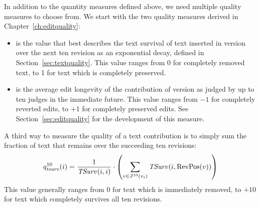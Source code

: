 In addition to the quantity measures defined above, we need
multiple quality measures to choose from.
We start with the two quality measures derived in
Chapter~\ref{ch:editquality}:
\begin{itemize}
\item {} is the value that best describes
    the text survival of text inserted in version 
    over the next ten revision as an exponential
    decay, defined in Section~\ref{sec:textquality}.
    This value ranges from 0 for completely removed text,
    to 1 for text which is completely preserved.
\item {} is the average edit longevity of
    the contribution of version  as judged by up
    to ten judges in the immediate future.
    This value ranges from $-1$ for completely reverted edits,
    to $+1$ for completely preserved edits.
    See Section~\ref{sec:editquality} for the development of
    this measure.
\end{itemize}

A third way to measure the quality of a text contribution
is to simply sum the fraction of text that remains over the
succeeding ten revisions:
%
\begin{equation*}
    \quality{tsurv}{10}{i} = \frac{1}{\tsurv{}{i,i}} \cdot
    \left( \sum_{v \in \judges{}{10}{\version{i}}} \tsurv{}{i,\revpos{v}} \right)
\end{equation*}
%
This value generally ranges from $0$ for text which is immediately removed,
to $+10$ for text which completely survives all ten revisions.

